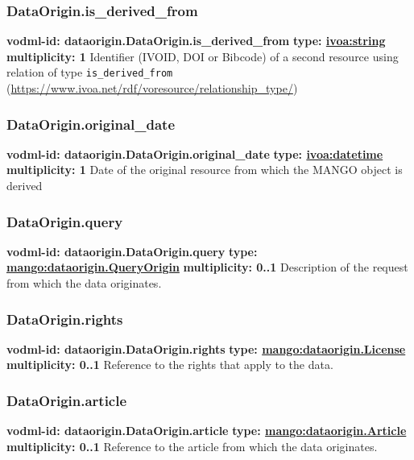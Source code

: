     \subsubsection{DataOrigin.is\_derived\_from}
    \textbf{vodml-id: dataorigin.DataOrigin.is\_derived\_from} \newline
    \textbf{type: \hyperref[sect:ivoa]{ivoa:string}} \newline
    \textbf{multiplicity: 1} \newline
    Identifier (IVOID, DOI or Bibcode) of a second resource using relation of type \texttt{is\_derived\_from} (\url{https://www.ivoa.net/rdf/voresource/relationship\_type/})

    \subsubsection{DataOrigin.original\_date}
    \textbf{vodml-id: dataorigin.DataOrigin.original\_date} \newline
    \textbf{type: \hyperref[sect:ivoa]{ivoa:datetime}} \newline
    \textbf{multiplicity: 1} \newline
    Date of the original resource from which the MANGO object is derived

    \subsubsection{DataOrigin.query}
    \textbf{vodml-id: dataorigin.DataOrigin.query} \newline
    \textbf{type: \hyperref[sect:dataorigin.QueryOrigin]{mango:dataorigin.QueryOrigin}} \newline
    \textbf{multiplicity: 0..1} \newline
    Description of the request from which the data originates.

    \subsubsection{DataOrigin.rights}
    \textbf{vodml-id: dataorigin.DataOrigin.rights} \newline
    \textbf{type: \hyperref[sect:dataorigin.License]{mango:dataorigin.License}} \newline
    \textbf{multiplicity: 0..1} \newline
    Reference to the rights that apply to the data.

    \subsubsection{DataOrigin.article}
    \textbf{vodml-id: dataorigin.DataOrigin.article} \newline
    \textbf{type: \hyperref[sect:dataorigin.Article]{mango:dataorigin.Article}} \newline
    \textbf{multiplicity: 0..1} \newline
    Reference to the article from which the data originates.

